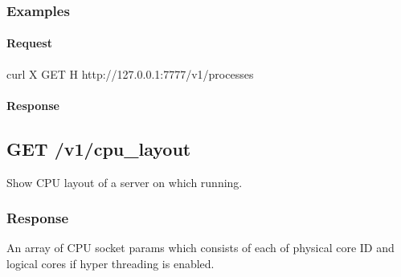 \documentclass[a4paper,11pt,openany,oneside,english]{sphinxmanual}
\begin{document}
\subsubsection{Examples}
\label{\detokenize{api_ref/proc_independ:examples}}

\paragraph{Request}
\label{\detokenize{api_ref/proc_independ:request}}
\begin{sphinxVerbatim}[commandchars=\\\{\},formatcom=\footnotesize]
 curl \PYGZhy{}X GET \PYGZhy{}H  
http://127.0.0.1:7777/v1/processes
\end{sphinxVerbatim}


\paragraph{Response}
\label{\detokenize{api_ref/proc_independ:id1}}
\begin{sphinxVerbatim}[commandchars=\\\{\},formatcom=\footnotesize]
\PYG{p}{[}
     
     
     
     
     
\PYG{p}{]}
\end{sphinxVerbatim}


\subsection{GET /v1/cpu\_layout}
\label{\detokenize{api_ref/proc_independ:get-v1-cpu-layout}}
Show CPU layout of a server on which  running.


\subsubsection{Response}
\label{\detokenize{api_ref/proc_independ:id2}}
An array of CPU socket params which consists of each of physical core ID and
logical cores if hyper threading is enabled.
\end{document}

